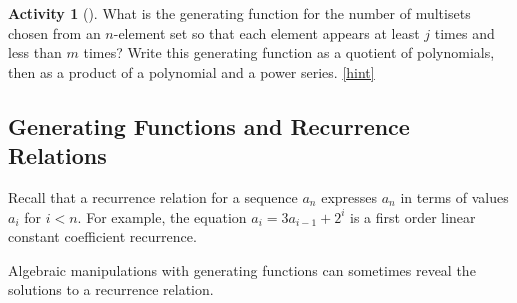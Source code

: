 \documentclass[10pt,]{book}
\theoremstyle{plain}
\theoremstyle{definition}
\theoremstyle{definition}
\theoremstyle{definition}
\newtheorem{activity}[project]{Activity}
\numberwithin{equation}{chapter}
\newcommand{\lt}{<}
\begin{document}
\begin{activity}[]\label{activity-250}
\hypertarget{p-1329}{}%
What is the generating function for the number of multisets chosen from an \(n\)-element set so that each element appears at least \(j\) times and less than \(m\) times? Write this generating function as a quotient of polynomials, then as a product of a polynomial and a power series.%
\hfill{\tiny\hyperlink{a-257}{[hint]}\hypertarget{q-257}{}}\end{activity}
\typeout{************************************************}
\typeout{************************************************}
\subsection[{Generating Functions and Recurrence Relations}]{Generating Functions and Recurrence Relations}\label{subsection-36}
\hypertarget{p-1332}{}%
Recall that a recurrence relation for a sequence \(a_n\) expresses \(a_n\) in terms of values \(a_i\) for \(i\lt n\). For example, the equation \(a_i=3a_{i-1} +2^i\) is a first order linear constant coefficient recurrence.%
\par
\hypertarget{p-1333}{}%
Algebraic manipulations with generating functions can sometimes reveal the solutions to a recurrence relation.%
\end{document}
